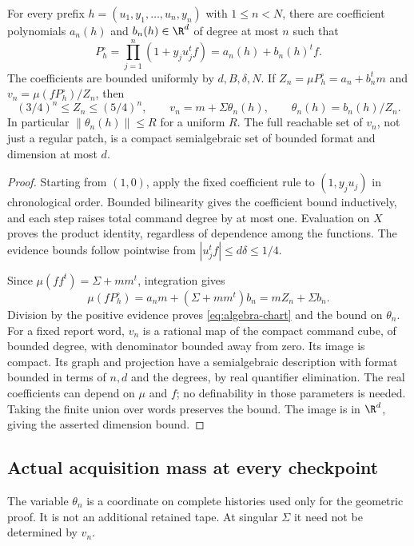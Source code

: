 \begin{lemma}
\label{lem:algebra-product-chart}
For every prefix $h=(u_1,y_1,\ldots,u_n,y_n)$ with $1\le n<N$, there
are coefficient polynomials $a_n(h)$ and $b_n(h)\in\R^d$ of degree at
most $n$ such that
\[
 P_h^\circ=\prod_{j=1}^n(1+y_j u_j^tf)=a_n(h)+b_n(h)^tf.
\]
The coefficients are bounded uniformly by $d,B,\delta,N$. If
$Z_n=\mu P_h^\circ=a_n+b_n^tm$ and $v_n=\mu(fP_h^\circ)/Z_n$, then
\begin{equation}\label{eq:algebra-chart}
 (3/4)^n\le Z_n\le(5/4)^n,\qquad
 v_n=m+\Sigma\theta_n(h),\qquad \theta_n(h)=b_n(h)/Z_n.
\end{equation}
In particular $\|\theta_n(h)\|\le R$ for a uniform $R$.
The full reachable set of $v_n$, not just a regular patch, is a compact
semialgebraic set of bounded format and dimension at most $d$.
\end{lemma}
\begin{proof}
Starting from $(1,0)$, apply the fixed coefficient rule to
$(1,y_j u_j)$ in chronological order. Bounded bilinearity gives the
coefficient bound inductively, and each step raises total command
degree by at most one. Evaluation on $X$ proves the product identity,
regardless of dependence among the functions. The evidence bounds follow
pointwise from $|u_j^tf|\le d\delta\le1/4$.

Since $\mu(ff^t)=\Sigma+mm^t$, integration gives
\[
 \mu(fP_h^\circ)=a_nm+(\Sigma+mm^t)b_n
                       =mZ_n+\Sigma b_n.
\]
Division by the positive evidence proves \eqref{eq:algebra-chart} and
the bound on $\theta_n$. For a fixed report word, $v_n$ is a rational
map of the compact command cube, of bounded degree, with denominator
bounded away from zero. Its image is compact. Its graph and projection
have a semialgebraic description with format bounded in terms of
$n,d$ and the degrees, by real quantifier elimination. The real
coefficients can depend on $\mu$ and $f$; no definability in those
parameters is needed. Taking the finite union over words preserves the
bound. The image is in $\R^d$, giving the asserted dimension bound.
\end{proof}

\subsection{Actual acquisition mass at every checkpoint}
The variable $\theta_n$ is a coordinate on complete histories used only
for the geometric proof. It is not an additional retained tape. At
singular $\Sigma$ it need not be determined by $v_n$.

